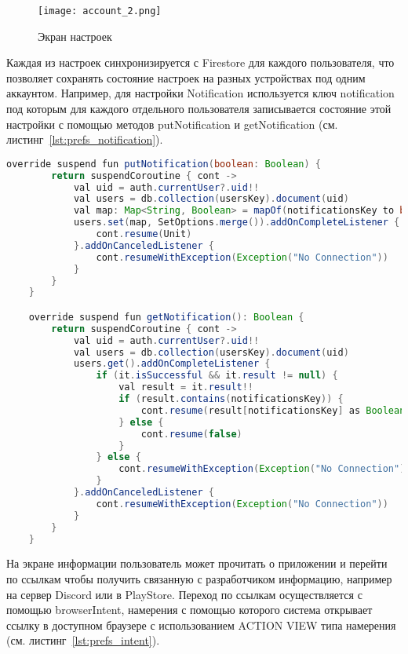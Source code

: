 \begin{figure}[H]
 \centering
   \texttt{[image: account\_2.png]} 
   \caption{Экран настроек}
   \label{fig:arch:account_2}
\end{figure}

Каждая из настроек синхронизируется с Firestore для каждого пользователя, что позволяет сохранять состояние настроек на разных устройствах под одним аккаунтом. Например, для настройки Notification используется ключ notification под которым для каждого отдельного пользователя записывается состояние этой настройки с помощью методов putNotification и getNotification  (см. листинг~\ref{lst:prefs_notification}).

\begin{lstlisting}[language=Java,label={lst:prefs_notification},caption={Методы для Notification}]
    override suspend fun putNotification(boolean: Boolean) {
        return suspendCoroutine { cont ->
            val uid = auth.currentUser?.uid!!
            val users = db.collection(usersKey).document(uid)
            val map: Map<String, Boolean> = mapOf(notificationsKey to boolean)
            users.set(map, SetOptions.merge()).addOnCompleteListener {
                cont.resume(Unit)
            }.addOnCanceledListener {
                cont.resumeWithException(Exception("No Connection"))
            }
        }
    }

    override suspend fun getNotification(): Boolean {
        return suspendCoroutine { cont ->
            val uid = auth.currentUser?.uid!!
            val users = db.collection(usersKey).document(uid)
            users.get().addOnCompleteListener {
                if (it.isSuccessful && it.result != null) {
                    val result = it.result!!
                    if (result.contains(notificationsKey)) {
                        cont.resume(result[notificationsKey] as Boolean)
                    } else {
                        cont.resume(false)
                    }
                } else {
                    cont.resumeWithException(Exception("No Connection"))
                }
            }.addOnCanceledListener {
                cont.resumeWithException(Exception("No Connection"))
            }
        }
    }
\end{lstlisting}

На экране информации пользователь может прочитать о приложении и перейти по ссылкам чтобы получить связанную с разработчиком информацию, например на сервер Discord или в PlayStore. Переход по ссылкам осуществляется с помощью browserIntent, намерения с помощью которого система открывает ссылку в доступном браузере с использованием ACTION VIEW типа намерения (см. листинг~\ref{lst:prefs_intent}).

